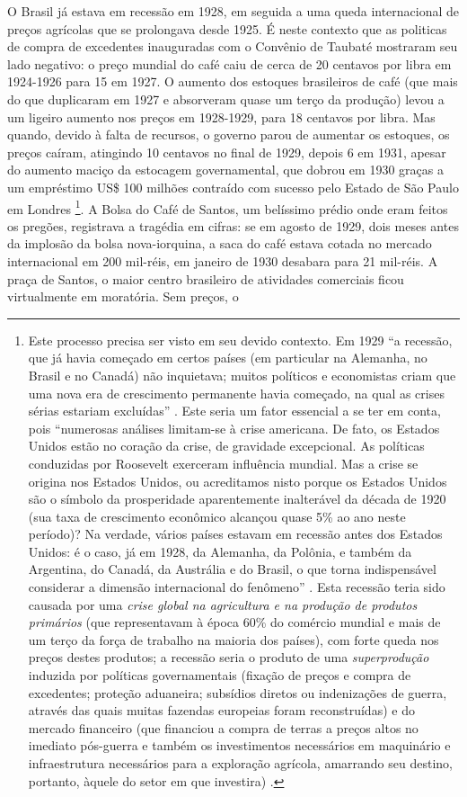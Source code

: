 O Brasil já estava em recessão em 1928, em seguida a uma queda internacional de preços agrícolas que se prolongava desde 1925. É neste contexto que as politicas de compra de excedentes inauguradas com o Convênio de Taubaté mostraram seu lado negativo: o preço mundial do café caiu de cerca de 20 centavos por libra em 1924-1926 para 15 em 1927. O aumento dos estoques brasileiros de café (que mais do que duplicaram em 1927 e absorveram quase um terço da produção) levou a um ligeiro aumento nos preços em 1928-1929, para 18 centavos por libra. Mas quando, devido à falta de recursos, o governo parou de aumentar os estoques, os preços caíram, atingindo 10 centavos no final de 1929, depois 6 em 1931, apesar do aumento maciço da estocagem governamental, que dobrou em 1930 graças a um empréstimo US\$ 100 milhões contraído com sucesso pelo Estado de São Paulo em Londres \cite[p.~25]{hautcoeur_1929_2009}\footnote{Este processo precisa ser visto em seu devido contexto. Em 1929 ``a recessão, que já havia começado em certos países (em particular na Alemanha, no Brasil e no Canadá) não inquietava; muitos políticos e economistas criam que uma nova era de crescimento permanente havia começado, na qual as crises sérias estariam excluídas'' \cite[p.~4]{hautcoeur_1929_2009}. Este seria um fator essencial a se ter em conta, pois ``numerosas análises limitam-se à crise americana. De fato, os Estados Unidos estão no coração da crise, de gravidade excepcional. As políticas conduzidas por Roosevelt exerceram influência mundial. Mas a crise se origina nos Estados Unidos, ou acreditamos nisto porque os Estados Unidos são o símbolo da prosperidade aparentemente inalterável da década de 1920 (sua taxa de crescimento econômico alcançou quase 5\% ao ano neste período)? Na verdade, vários países estavam em recessão antes dos Estados Unidos: é o caso, já em 1928, da Alemanha, da Polônia, e também da Argentina, do Canadá, da Austrália e do Brasil, o que torna indispensável considerar a dimensão internacional do fenômeno'' \cite[p.~7]{hautcoeur_1929_2009}. Esta recessão teria sido causada por uma \textit{crise global na agricultura e na produção de produtos primários} (que representavam à época 60\% do comércio mundial e mais de um terço da força de trabalho na maioria dos países), com forte queda nos preços destes produtos; a recessão seria o produto de uma \textit{superprodução} induzida por políticas governamentais (fixação de preços e compra de excedentes; proteção aduaneira; subsídios diretos ou indenizações de guerra, através das quais muitas fazendas europeias foram reconstruídas) e do mercado financeiro (que financiou a compra de terras a preços altos no imediato pós-guerra e também os investimentos necessários em maquinário e infraestrutura necessários para a exploração agrícola, amarrando seu destino, portanto, àquele do setor em que investira) \cite[pp.~22-25]{hautcoeur_1929_2009}. }. A Bolsa do Café de Santos, um belíssimo prédio onde eram feitos os pregões, registrava a tragédia em cifras: se em agosto de 1929, dois meses antes da implosão da bolsa nova-iorquina, a saca do café estava cotada no mercado internacional em 200 mil-réis, em janeiro de 1930 desabara para 21 mil-réis. A praça de Santos, o maior centro brasileiro de atividades comerciais ficou virtualmente em moratória. Sem preços, o 